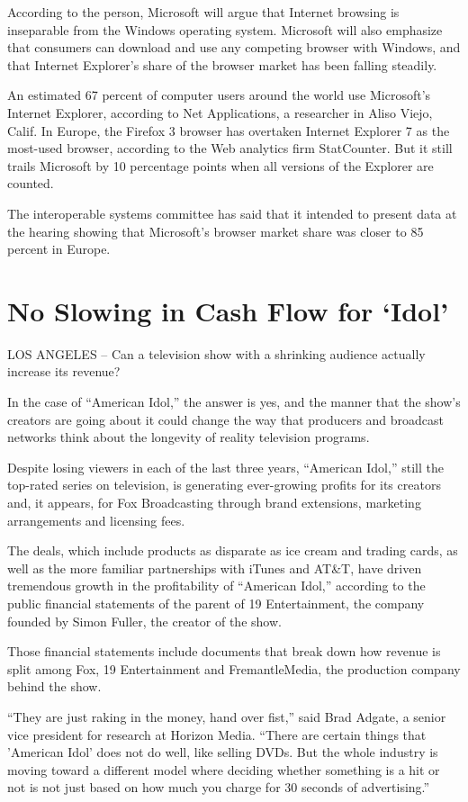 \documentclass[12pt,a4paper,onecolumn]{article}
\begin{document}
According to the person, Microsoft will argue that Internet browsing is inseparable from the Windows
operating system. Microsoft will also emphasize that consumers can download and use any competing
browser with Windows, and that Internet Explorer's share of the browser market has been falling
steadily.

An estimated 67 percent of computer users around the world use Microsoft's Internet Explorer,
according to Net Applications, a researcher in Aliso Viejo, Calif. In Europe, the Firefox 3 browser
has overtaken Internet Explorer 7 as the most-used browser, according to the Web analytics firm
StatCounter. But it still trails Microsoft by 10 percentage points when all versions of the Explorer
are counted.

The interoperable systems committee has said that it intended to present data at the hearing showing
that Microsoft's browser market share was closer to 85 percent in Europe.

\section{No Slowing in Cash Flow for `Idol'}

LOS ANGELES -- Can a television show with a shrinking audience actually increase its revenue?

In the case of ``American Idol,'' the answer is yes, and the manner that the show's creators are
going about it could change the way that producers and broadcast networks think about the longevity
of reality television programs.

Despite losing viewers in each of the last three years, ``American Idol,'' still the top-rated
series on television, is generating ever-growing profits for its creators and, it appears, for Fox
Broadcasting through brand extensions, marketing arrangements and licensing fees.

The deals, which include products as disparate as ice cream and trading cards, as well as the more
familiar partnerships with iTunes and AT\&T, have driven tremendous growth in the profitability of
``American Idol,'' according to the public financial statements of the parent of 19 Entertainment,
the company founded by Simon Fuller, the creator of the show.

Those financial statements include documents that break down how revenue is split among Fox, 19
Entertainment and FremantleMedia, the production company behind the show.

``They are just raking in the money, hand over fist,'' said Brad Adgate, a senior vice president for
research at Horizon Media. ``There are certain things that 'American Idol' does not do well, like
selling DVDs. But the whole industry is moving toward a different model where deciding whether
something is a hit or not is not just based on how much you charge for 30 seconds of advertising.''
\end{document}
